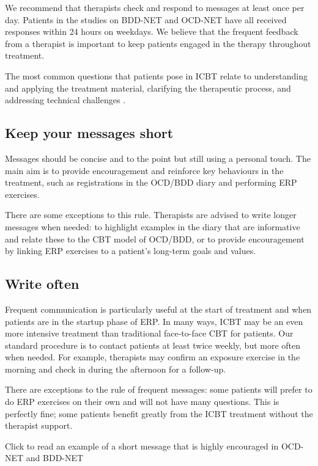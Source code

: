 \documentclass[]{book}
\theoremstyle{definition}
\theoremstyle{definition}
\theoremstyle{definition}
\theoremstyle{remark}
\begin{document}
We recommend that therapists check and respond to messages at least once
per day. Patients in the studies on BDD-NET and OCD-NET have all
received responses within 24 hours on weekdays. We believe that the
frequent feedback from a therapist is important to keep patients engaged
in the therapy throughout treatment.

The most common questions that patients pose in ICBT relate to
understanding and applying the treatment material, clarifying the
therapeutic process, and addressing technical challenges
\citep{soucy2019}.

\hypertarget{keep-your-messages-short}{%
\subsection{Keep your messages short}\label{keep-your-messages-short}}

Messages should be concise and to the point but still using a personal
touch. The main aim is to provide encouragement and reinforce key
behaviours in the treatment, such as registrations in the OCD/BDD diary
and performing ERP exercises.

There are some exceptions to this rule. Therapists are advised to write
longer messages when needed: to highlight examples in the diary that are
informative and relate these to the CBT model of OCD/BDD, or to provide
encouragement by linking ERP exercises to a patient's long-term goals
and values.

\hypertarget{write-often}{%
\subsection{Write often}\label{write-often}}

Frequent communication is particularly useful at the start of treatment
and when patients are in the startup phase of ERP. In many ways, ICBT
may be an even more intensive treatment than traditional face-to-face
CBT for patients. Our standard procedure is to contact patients at least
twice weekly, but more often when needed. For example, therapists may
confirm an exposure exercise in the morning and check in during the
afternoon for a follow-up.

There are exceptions to the rule of frequent messages: some patients
will prefer to do ERP exercises on their own and will not have many
questions. This is perfectly fine; some patients benefit greatly from
the ICBT treatment without the therapist support.

 Click to read an example of a short message that is highly encouraged
in OCD-NET and BDD-NET
\end{document}
